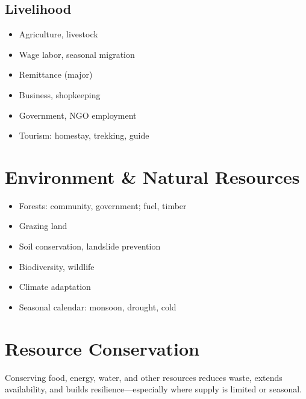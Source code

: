 \documentclass[11pt,a4paper]{article}
\begin{document}
\subsection{Livelihood}
\begin{itemize}
    \item Agriculture, livestock
    \item Wage labor, seasonal migration
    \item Remittance (major)
    \item Business, shopkeeping
    \item Government, NGO employment
    \item Tourism: homestay, trekking, guide
\end{itemize}

\section{Environment \& Natural Resources}

\begin{itemize}
    \item Forests: community, government; fuel, timber
    \item Grazing land
    \item Soil conservation, landslide prevention
    \item Biodiversity, wildlife
    \item Climate adaptation
    \item Seasonal calendar: monsoon, drought, cold
\end{itemize}

\section{Resource Conservation}

Conserving food, energy, water, and other resources reduces waste, extends availability, and builds resilience---especially where supply is limited or seasonal.
\end{document}
